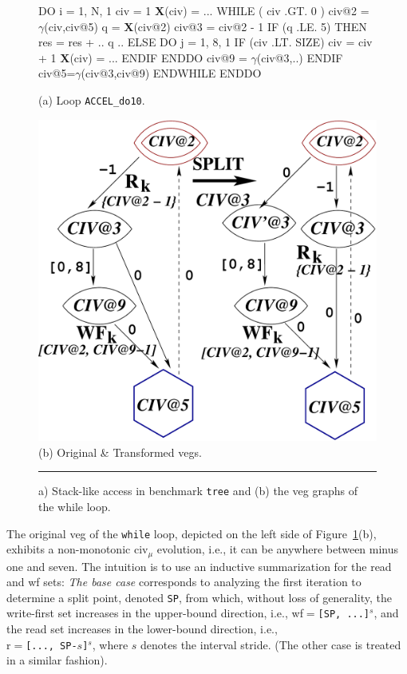 \documentclass{sig-alternate}
\newcommand{\mymath}[1]{$ #1 $}
\begin{document}
\begin{figure}
\begin{minipage}{0.4\columnwidth}
\begin{colorcode}
DO i = 1, N, 1
 civ = 1
 {\bf{}X}(civ) = ...
 WHILE ( civ .GT. 0 )
  civ@2 = \mymath{\gamma}(civ,civ@5)
  q = {\bf X}(civ@2)
  civ@3 = civ@2 - 1
  IF (q .LE. 5) THEN
   res = res + .. q ..
  ELSE
   DO j = 1, 8, 1
    IF (civ .LT. SIZE) 
      civ = civ + 1
      {\bf{}X}(civ) = ...
   ENDIF ENDDO
   civ@9 = \mymath{\gamma}(civ@3,..)
  ENDIF
  civ@5=\mymath{\gamma}(civ@3,civ@9)
ENDWHILE ENDDO   
\end{colorcode}
\vspace{-1ex}
(a) Loop {\tt ACCEL\_do10}.
\end{minipage}
\begin{minipage}{0.56\columnwidth}
\includegraphics[width=1.1\textwidth]{Figures/VEG_TREE}\\
(b) Original \& Transformed {\sc veg}s.
\end{minipage}
\hrule
\caption{a) Stack-like access in benchmark {\tt tree} and (b) the {\sc veg} graphs of the while loop.}
\vspace{-1ex}
\label{fig:Tree} %
\end{figure}


The original {\sc veg} of the {\tt while} loop, depicted on the left 
side of Figure~\ref{fig:Tree}(b), exhibits a non-monotonic {\sc civ}$_\mu$
evolution, i.e., it can be anywhere between minus one and seven.
%
The intuition is to use an inductive summarization for the read and {\sc wf} sets:
{\em The base case} corresponds to analyzing the first iteration to determine a split point, 
denoted {\tt SP}, from which, without loss of generality, the write-first set increases in the 
upper-bound direction, i.e., {\sc wf}$=${\tt[SP, ...]$^s$}, and the read set increases in the lower-bound
direction, i.e., \\
{\sc r}$=${\tt [..., SP-$s$]$^s$}, where $s$ denotes the interval stride.
(The other case is treated in a similar fashion).
\end{document}
